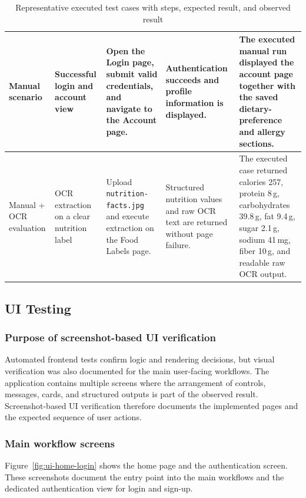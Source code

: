 \begin{table}[H]
\begin{tabularx}{\textwidth}{|>{\raggedright\arraybackslash}p{1.6cm}|>{\raggedright\arraybackslash}p{2.4cm}|>{\raggedright\arraybackslash}X|>{\raggedright\arraybackslash}X|>{\raggedright\arraybackslash}X|}
		\hline
		Manual scenario & Successful login and account view & Open the Login page, submit valid credentials, and navigate to the Account page. & Authentication succeeds and profile information is displayed. & The executed manual run displayed the account page together with the saved dietary-preference and allergy sections. \\
		\hline
		Manual + OCR evaluation & OCR extraction on a clear nutrition label & Upload \texttt{nutrition-facts.jpg} and execute extraction on the Food Labels page. & Structured nutrition values and raw OCR text are returned without page failure. & The executed case returned calories 257, protein 8\,g, carbohydrates 39.8\,g, fat 9.4\,g, sugar 2.1\,g, sodium 41\,mg, fiber 10\,g, and readable raw OCR output. \\
		\hline
		\end{tabularx}
	\caption{Representative executed test cases with steps, expected result, and observed result}
	\label{tab:representative-test-cases}
\end{table}

\subsection{UI Testing}

\subsubsection{Purpose of screenshot-based UI verification}

Automated frontend tests confirm logic and rendering decisions, but
visual verification was also documented for the main user-facing
workflows. The application contains multiple screens where the
arrangement of controls, messages, cards, and structured outputs is
part of the observed result. Screenshot-based UI verification therefore
documents the implemented pages and the expected sequence of user
actions.

\subsubsection{Main workflow screens}

Figure~\ref{fig:ui-home-login} shows the home page and the
authentication screen. These screenshots document the entry point into
the main workflows and the dedicated authentication view for login and
sign-up.

